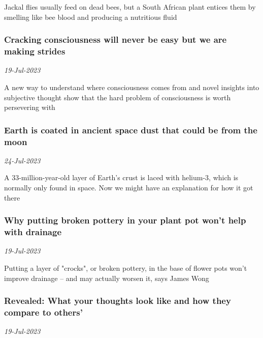 Jackal flies usually feed on dead bees, but a South African plant entices them by smelling like bee blood and producing a nutritious fluid
\subsubsection{Cracking consciousness will never be easy but we are making strides \href{https://www.newscientist.com/article/mg25934483-200-cracking-consciousness-will-never-be-easy-but-we-are-making-strides/?utm_campaign=RSS%7CNSNS&utm_source=NSNS&utm_medium=RSS&utm_content=home}{\ding{225}}}
\textit{19-Jul-2023}

A new way to understand where consciousness comes from and novel insights into subjective thought show that the hard problem of consciousness is worth persevering with
\subsubsection{Earth is coated in ancient space dust that could be from the moon \href{https://www.newscientist.com/article/2383756-earth-is-coated-in-ancient-space-dust-that-could-be-from-the-moon/?utm_campaign=RSS%7CNSNS&utm_source=NSNS&utm_medium=RSS&utm_content=home}{}}
\textit{24-Jul-2023}

A 33-million-year-old layer of Earth's crust is laced with helium-3, which is normally only found in space. Now we might have an explanation for how it got there
\subsubsection{Why putting broken pottery in your plant pot won't help with drainage \href{https://www.newscientist.com/article/mg25934481-100-why-putting-broken-pottery-in-your-plant-pot-wont-help-with-drainage/?utm_campaign=RSS%7CNSNS&utm_source=NSNS&utm_medium=RSS&utm_content=home}{\ding{225}}}
\textit{19-Jul-2023}

Putting a layer of "crocks", or broken pottery, in the base of flower pots won't improve drainage – and may actually worsen it, says James Wong
\subsubsection{Revealed: What your thoughts look like and how they compare to others’ \href{https://www.newscientist.com/article/mg25934484-800-revealed-what-your-thoughts-look-like-and-how-they-compare-to-others/?utm_campaign=RSS%7CNSNS&utm_source=NSNS&utm_medium=RSS&utm_content=home}{}}
\textit{19-Jul-2023}

